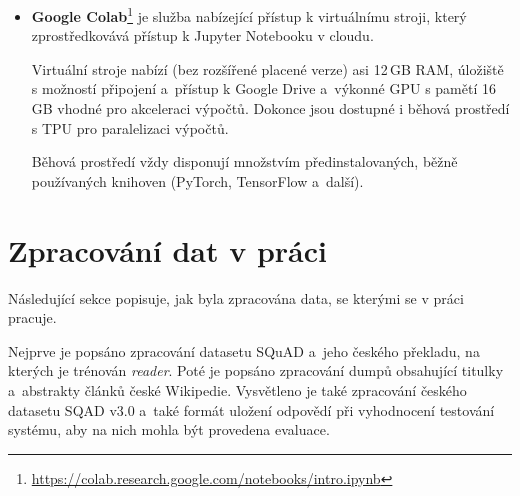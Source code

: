 \begin{itemize}
    \item \textbf{Google Colab}\footnote{\url{https://colab.research.google.com/notebooks/intro.ipynb}}
    je služba nabízející přístup k virtuálnímu stroji, který zprostředkovává přístup k Jupyter Notebooku v cloudu.\par 
    Virtuální stroje nabízí (bez rozšířené placené verze) asi 12\,GB RAM, úložiště s možností připojení a~přístup k Google Drive a~výkonné GPU s pamětí 16\,GB vhodné pro akceleraci výpočtů. Dokonce jsou dostupné i běhová prostředí s TPU pro paralelizaci výpočtů.\par
    Běhová prostředí vždy disponují množstvím předinstalovaných, běžně používaných knihoven (PyTorch, TensorFlow a~další).
    
\end{itemize}

\section{Zpracování dat v práci}
\label{data_processing}
Následující sekce popisuje, jak byla zpracována data, se kterými se v práci pracuje. \par
\noindent Nejprve je popsáno zpracování datasetu SQuAD a~jeho českého překladu, na kterých je trénován \emph{reader}. Poté je popsáno zpracování dumpů obsahující titulky a~abstrakty článků české Wikipedie. Vysvětleno je také zpracování českého datasetu SQAD v3.0 a~také formát uložení odpovědí při vyhodnocení testování systému, aby na nich mohla být provedena evaluace. 

